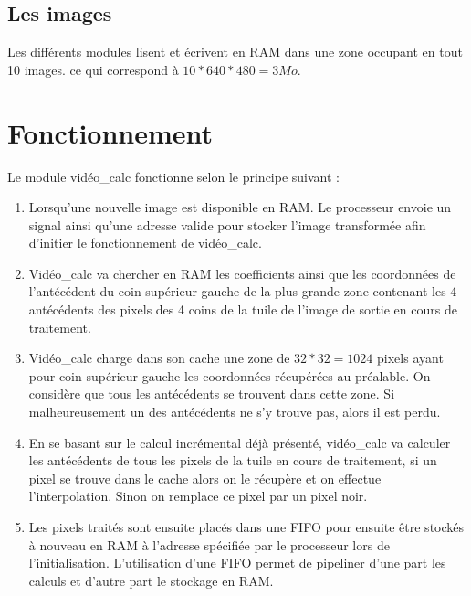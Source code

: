 \documentclass[a4paper,12pt]{report}
\begin{document}
{{	                       \subsection*{Les images}

                               Les différents modules lisent et écrivent en RAM dans une zone occupant en tout 10 images. ce qui correspond à $10*640*480 = 3Mo$.

	                       \section{Fonctionnement}

                               Le module vidéo\_calc fonctionne selon le principe suivant :

                               \begin{enumerate}

                               \item  Lorsqu'une nouvelle image est disponible en RAM. Le processeur envoie un signal ainsi qu'une adresse valide pour stocker l'image transformée afin d'initier le fonctionnement de vidéo\_calc.

                               \item Vidéo\_calc va chercher en RAM les coefficients ainsi que les coordonnées de l'antécédent du coin supérieur gauche de la plus grande zone contenant les 4 antécédents des pixels des 4 coins de la tuile de l'image de sortie en cours de traitement.

                               \item Vidéo\_calc charge dans son cache une zone de $32*32 = 1024$ pixels ayant pour coin supérieur gauche les coordonnées récupérées au préalable. On considère que tous les antécédents se trouvent dans cette zone. Si malheureusement un des antécédents ne s'y trouve pas, alors il est perdu.

                               \item En se basant sur le calcul incrémental déjà présenté, vidéo\_calc va calculer les antécédents de tous les pixels de la tuile en cours de traitement, si un pixel se trouve dans le cache alors on le récupère et  on effectue l'interpolation. Sinon on remplace ce pixel par un pixel noir.

                               \item Les pixels traités sont ensuite placés dans une FIFO pour ensuite être stockés à nouveau en RAM à l'adresse spécifiée par le processeur lors de l'initialisation. L'utilisation d'une FIFO permet de pipeliner d'une part les calculs et d'autre part le stockage en RAM.


\end{enumerate}}}
\end{document}
